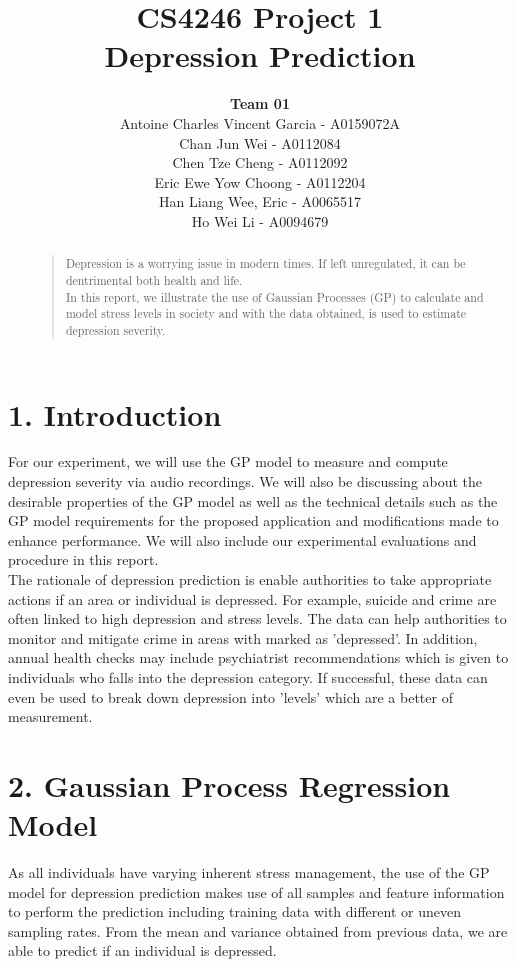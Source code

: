 \documentclass{article}
\title{
	CS4246 Project 1\\ Depression Prediction
}
\author{
	{\bf Team 01} \\
	Antoine Charles Vincent Garcia - A0159072A\\
	Chan Jun Wei - A0112084\\
	Chen Tze Cheng - A0112092\\
	Eric Ewe Yow Choong - A0112204\\
	Han Liang Wee, Eric - A0065517\\
	Ho Wei Li - A0094679\\
}
\begin{document}
 	\maketitle

	\begin{abstract}
	\begin{quote}
	Depression is a worrying issue in modern times. If left unregulated, it can be dentrimental both health and life. \\
	
	In this report, we illustrate the use of Gaussian Processes (GP) to calculate and model stress levels in society and with the data obtained, is used to estimate depression severity.
	\end{quote}
	\end{abstract}
	
	\section{1.	  Introduction}
	For our experiment, we will use the GP model to measure and compute depression severity via audio recordings. We will also be discussing about the desirable properties of the GP model as well as the technical details such as the GP model requirements for the proposed application and modifications made to enhance performance. We will also include our experimental evaluations and procedure in this report. \\

	The rationale of depression prediction is enable authorities to take appropriate actions if an area or individual is depressed. For example, suicide and crime are often linked to high depression and stress levels. The data can help authorities to monitor and mitigate crime in areas with marked as 'depressed'. In addition, annual health checks may include psychiatrist recommendations which is given to individuals who falls into the depression category. If successful, these data can even be used to break down depression into 'levels' which are a better of measurement.

	\section{2.  Gaussian Process Regression Model}
	As all individuals have varying inherent stress management, the use of the GP model for depression prediction makes use of all samples and feature information to perform the prediction including training data with different or uneven sampling rates. From the mean and variance obtained from previous data, we are able to predict if an individual is depressed. \\	
\end{document}
